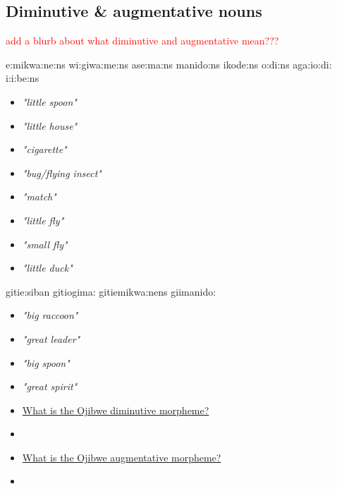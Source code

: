 \documentclass[a4paper,11pt]{article}
\begin{document}
\pagebreak



\subsection{Diminutive \& augmentative nouns}

\textcolor{red}{add a blurb about what diminutive and augmentative mean???}

\vspace{1cm}

\begin{multicols}{2}
\begin{exe}
\ex e:mikwa:ne:ns 
\ex wi:giwa:me:ns 
\ex ase:ma:ns 
\ex manido:ns 
\ex ikode:ns
\ex o:d{\textyogh}i:ns 
\ex aga:io:d{\textyogh}i: 
\ex {\textyogh}i:i:be:ns 
\end{exe}
\columnbreak
\begin{itemize}
\item[] \textit{"little spoon"}
\item[] \textit{"little house"}
\item[] \textit{"cigarette"}
\item[] \textit{"bug/flying insect"}
\item[] \textit{"match"}
\item[] \textit{"little fly"}
\item[] \textit{"small fly"}
\item[] \textit{"little duck"}
\end{itemize}
\end{multicols}

\begin{multicols}{2}
\begin{exe}
\ex gitie:siban 
\ex git{\textyogh}iogima: 
\ex git{}iemikwa:nens 
\ex giimanido: 
\end{exe}
\columnbreak
\begin{itemize}
\item[] \textit{"big raccoon"}
\item[] \textit{"great leader"}
\item[] \textit{"big spoon"}
\item[] \textit{"great spirit"}
\end{itemize}
\end{multicols}

\vspace{1cm}

\begin{itemize}
\item \underline{What is the Ojibwe diminutive morpheme?}
\item[] 
\item \underline{What is the Ojibwe augmentative morpheme?}
\item[] 
\end{itemize}
\end{document}

